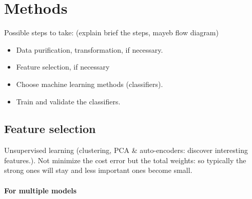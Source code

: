 \documentclass[a4paper]{article}
\begin{document}

\newpage

\section{Methods}



Possible steps to take: (explain brief the steps, mayeb flow diagram)

\begin{itemize}
\item Data purification, transformation, if necessary.
\item Feature selection, if necessary
\item Choose machine learning methods (classifiers).
\item Train and validate the classifiers.
\end{itemize}

\subsection{Feature selection}

Unsupervised learning (clustering, PCA \& auto-encoders: discover interesting features.). Not minimize the cost error but the total weights: so typically the strong ones will stay and less important ones become small.

\paragraph{For multiple models}
\end{document}
